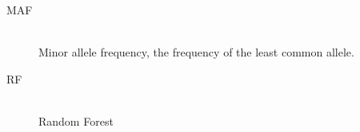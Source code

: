 \documentclass[10pt,a4paper]{report}
\newcounter{algorithmCode}
\begin{document}
\begin{description}
\item[MAF] \hfill \\
  Minor allele frequency, the frequency of the least common allele.
\item[RF] \hfill \\
  Random Forest

\end{description}

\end{document}
